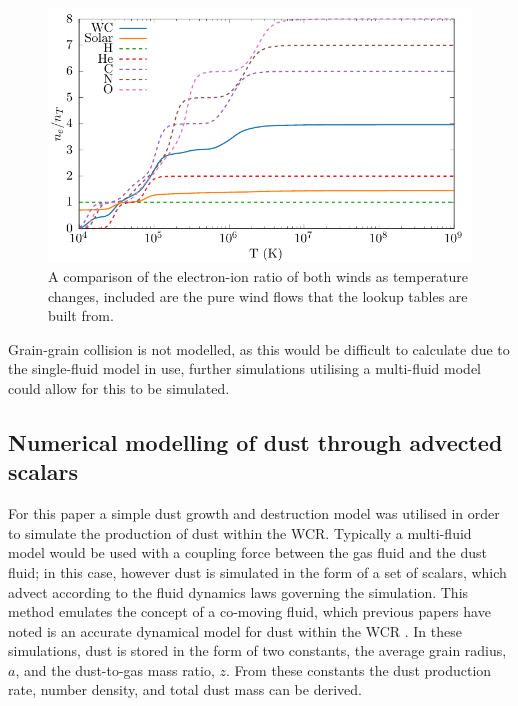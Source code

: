 \begin{figure}[ht]
  \centering
  \includegraphics{assets/ionisation-fraction/ionisation-fraction.pdf}
  \caption[OB and WR electron-ion ratios]{A comparison of the electron-ion ratio of both winds as temperature changes, included are the pure wind flows that the lookup tables are built from.}
  \label{fig:electron-curve}
\end{figure}

Grain-grain collision is not modelled, as this would be difficult to calculate due to the single-fluid model in use, further simulations utilising a multi-fluid model could allow for this to be simulated.



\subsection{Numerical modelling of dust through advected scalars}

For this paper a simple dust growth and destruction model was utilised in order to simulate the production of dust within the WCR. Typically a multi-fluid model would be used with a coupling force between the gas fluid and the dust fluid; in this case, however dust is simulated in the form of a set of scalars, which advect according to the fluid dynamics laws governing the simulation. This method emulates the concept of a co-moving fluid, which previous papers have noted is an accurate dynamical model for dust within the WCR \parencite{hendrix_pinwheels_2016}. In these simulations, dust is stored in the form of two constants, the average grain radius, $a$, and the dust-to-gas mass ratio, $z$. From these constants the dust production rate, number density, and total dust mass can be derived.

